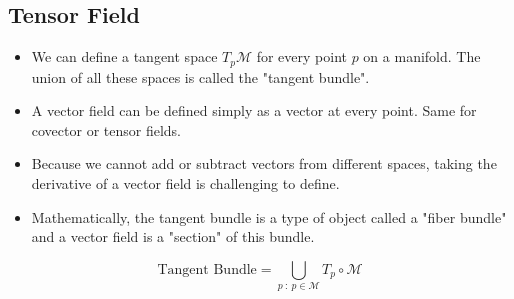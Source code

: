 \documentclass[10pt]{article}
\begin{document}
\subsection*{Tensor Field}
\begin{itemize}
    \item We can define a tangent space $T_p \mathcal{M}$ for every point $p$ on a manifold.  The union of all these spaces is called the "tangent bundle".
    \item A vector field can be defined simply as a vector at every point.  Same for covector or tensor fields.
    \item Because we cannot add or subtract vectors from different spaces, taking the derivative of a vector field is challenging to define.
    \item Mathematically, the tangent bundle is a type of object called a "fiber bundle" and a vector field is a "section" of this bundle.
\end{itemize}
\[\text{Tangent Bundle} = \bigcup_{p \::\: p \in \mathcal{M}} T_p \circ \mathcal{M}\]
\end{document}
